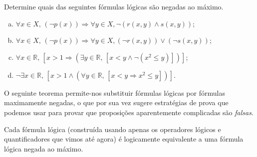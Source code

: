 \begin{exercise}
Determine quais das seguintes fórmulas lógicas são negadas ao máximo.
\begin{enumerate}[(a)]
\item $\forall x \in X,\, (\neg p(x)) \Rightarrow \forall y \in X, \neg (r(x,y) \wedge s(x,y))$;
\item $\forall x \in X,\, (\neg p(x)) \Rightarrow \forall y \in X, (\neg r(x,y)) \vee (\neg s(x,y))$;
\item $\forall x \in \mathbb{R},\, [x > 1 \Rightarrow (\exists y \in \mathbb{R},\, [x < y \wedge \neg (x^2 \le y)])]$;
\item $\neg \exists x \in \mathbb{R},\, [x > 1 \wedge (\forall y \in \mathbb{R},\, [x < y \Rightarrow x^2 \le y])]$.
\end{enumerate}
\end{exercise}

O seguinte teorema permite-nos substituir fórmulas lógicas por fórmulas maximamente negadas, o que por sua vez sugere estratégias de prova que podemos usar para provar que proposições aparentemente complicadas são \textit{falsas}.

\begin{theorem}
\label{thmLogicalFormulaEquivalentToMaximallyNegated}
Cada fórmula lógica (construída usando apenas os operadores lógicos e quantificadores que vimos até agora) é logicamente equivalente a uma fórmula lógica negada ao máximo.
\end{theorem}

